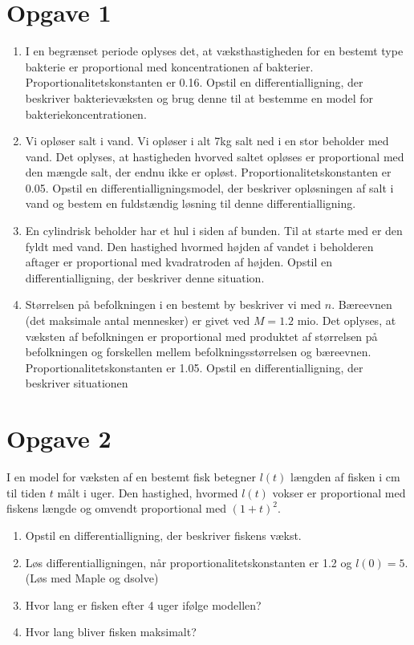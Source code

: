 \section*{Opgave 1}
\begin{enumerate}[label=\roman*)]
	\item I en begrænset periode oplyses det, at væksthastigheden for en bestemt type bakterie er proportional med koncentrationen af bakterier. Proportionalitetskonstanten er 0.16. Opstil en 
	differentialligning, der beskriver bakterievæksten og brug denne til at bestemme en model for bakteriekoncentrationen. 
	\item Vi opløser salt i vand. Vi opløser i alt 7kg salt ned i en stor beholder med vand. Det oplyses, at hastigheden hvorved saltet opløses er proportional med den mængde salt, der endnu ikke er 
	opløst. Proportionalitetskonstanten er 0.05. Opstil en differentialligningsmodel, der beskriver opløsningen af salt i vand og bestem en fuldstændig løsning til denne differentialligning. 
	\item En cylindrisk beholder har et hul i siden af bunden. Til at starte med er den fyldt med vand. Den hastighed hvormed højden af vandet i beholderen aftager er proportional med kvadratroden af 
	højden. Opstil en differentialligning, der beskriver denne situation.
	\item Størrelsen på befolkningen i en bestemt by beskriver vi med $n$. Bæreevnen (det maksimale antal mennesker) er givet ved $M = 1.2$ mio. Det oplyses, at væksten af befolkningen er proportional 
	med produktet af størrelsen på befolkningen og forskellen mellem befolkningsstørrelsen og bæreevnen. Proportionalitetskonstanten er 1.05. Opstil en differentialligning, der beskriver situationen
\end{enumerate}

\section*{Opgave 2}

I en model for væksten af en bestemt fisk betegner $l(t)$ længden af fisken i cm til tiden $t$ målt i uger. Den hastighed, hvormed $l(t)$ vokser er proportional med fiskens længde og omvendt proportional med $(1+t)^2.$

\begin{enumerate}[label=\roman*)]
	\item Opstil en differentialligning, der beskriver fiskens vækst. 
	\item Løs differentialligningen, når proportionalitetskonstanten er 1.2 og $l(0) = 5$. (Løs med Maple og dsolve)
	\item Hvor lang er fisken efter 4 uger ifølge modellen?
	\item Hvor lang bliver fisken maksimalt?
\end{enumerate}



